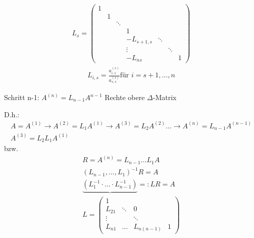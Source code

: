 \begin{align*}
		L_s = \begin{pmatrix}
		      1 &   &        &            &        &        & \\
					  & 1 &        &            &        &        & \\
						&   & \ddots &            &        &        & \\
						&   &        & 1          &        &        & \\
						&   &        & -L_{s+1,s} & \ddots &        & \\
						&   &        & \vdots     &        & \ddots & \\
						&   &        & -L_{ns}    &        &        & 1
		      \end{pmatrix}
\end{align*}
\begin{align*}
  L_{i,s} = \frac{a_{i,s}^{(s)}}{a_{s,s}^{(s)}} \text{für } i = s + 1, \ldots, n
\end{align*}

Schritt n-1: $A^{\left(n\right)} = L_{n-1}A^{n-1}$
Rechte obere
$\Delta$-Matrix

D.h.: 
\begin{equation*}
  \begin{aligned}
A = A^{(1)} \rightarrow A^{(2)} = L_1A^{(1)} \rightarrow A^{(3)} = L_2A^{(2)} \ldots \rightarrow A^{(n)} = L_{n-1}A^{(n-1)} \\
A^{(3)} = L_2L_1A^{(1)}
  \end{aligned}
\end{equation*}
bzw.
\begin{equation*}
  \begin{aligned}
    R = A^{(n)} = L_{n-1} \ldots L_1 A  \\
		(L_{n-1}, \ldots, L_1)^{-1}R = A  \\
		\underbrace{(L_1^{-1} \cdot \ldots \cdot L_{n-1}^{-1})}{=:L}R = A  \\
		L = \begin{pmatrix}
		    1      &        &        &  \\
				L_{21} & \ddots & 0      &  \\
				\vdots &        & \ddots &  \\
				L_{n1} & \ldots & L_{n\left(n-1\right)} & 1
		    \end{pmatrix}
	\end{aligned}
\end{equation*}

